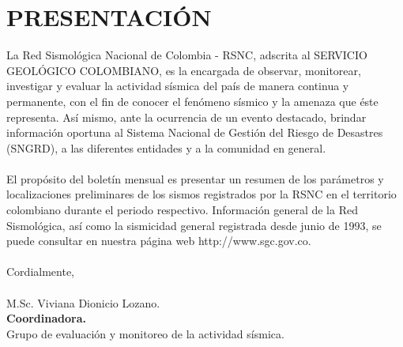 

\chapter{PRESENTACIÓN}
\noindent La Red Sismológica Nacional de Colombia - RSNC, adscrita al SERVICIO GEOLÓGICO COLOMBIANO, es la encargada de observar, monitorear, investigar y evaluar la actividad sísmica del país de manera continua y permanente, con el fin de conocer el fenómeno sísmico y la amenaza que éste representa. Así mismo, ante la ocurrencia de un evento destacado, brindar información oportuna al Sistema Nacional de  Gestión del Riesgo de Desastres (SNGRD), a las diferentes entidades y a la comunidad en general.\\\\


\noindent El propósito del boletín mensual es presentar un resumen de los parámetros y localizaciones preliminares de los sismos registrados por la RSNC en el territorio colombiano durante el periodo respectivo. Información general de la Red Sismológica, así como la sismicidad general registrada desde junio de 1993, se puede consultar en nuestra página web http://www.sgc.gov.co. \\\\



\noindent Cordialmente,  \\\\


\noindent M.Sc. Viviana Dionicio Lozano.\\ 
{\bf \sffamily\textcolor{ocre}{Coordinadora.}}\\ 
Grupo de evaluación y monitoreo de la actividad sísmica.\\

\pagebreak

